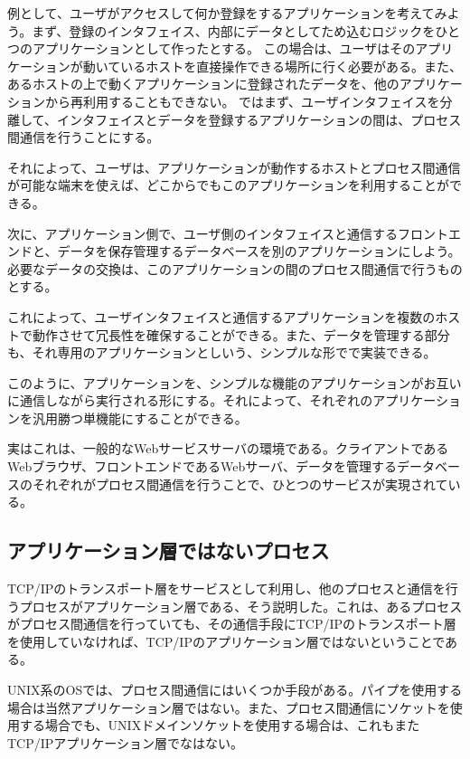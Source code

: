 例として、ユーザがアクセスして何か登録をするアプリケーションを考えてみよう。まず、登録のインタフェイス、内部にデータとしてため込むロジックをひとつのアプリケーションとして作ったとする。
この場合は、ユーザはそのアプリケーションが動いているホストを直接操作できる場所に行く必要がある。また、あるホストの上で動くアプリケーションに登録されたデータを、他のアプリケーションから再利用することもできない。
ではまず、ユーザインタフェイスを分離して、インタフェイスとデータを登録するアプリケーションの間は、プロセス間通信を行うことにする。

それによって、ユーザは、アプリケーションが動作するホストとプロセス間通信が可能な端末を使えば、どこからでもこのアプリケーションを利用することができる。

次に、アプリケーション側で、ユーザ側のインタフェイスと通信するフロントエンドと、データを保存管理するデータベースを別のアプリケーションにしよう。必要なデータの交換は、このアプリケーションの間のプロセス間通信で行うものとする。

これによって、ユーザインタフェイスと通信するアプリケーションを複数のホストで動作させて冗長性を確保することができる。また、データを管理する部分も、それ専用のアプリケーションとしいう、シンプルな形でで実装できる。

このように、アプリケーションを、シンプルな機能のアプリケーションがお互いに通信しながら実行される形にする。それによって、それぞれのアプリケーションを汎用勝つ単機能にすることができる。

実はこれは、一般的なWebサービスサーバの環境である。クライアントであるWebブラウザ、フロントエンドであるWebサーバ、データを管理するデータベースのそれぞれがプロセス間通信を行うことで、ひとつのサービスが実現されている。



\subsection{アプリケーション層ではないプロセス}
TCP/IPのトランスポート層をサービスとして利用し、他のプロセスと通信を行うプロセスがアプリケーション層である、そう説明した。これは、あるプロセスがプロセス間通信を行っていても、その通信手段にTCP/IPのトランスポート層を使用していなければ、TCP/IPのアプリケーション層ではないということである。

UNIX系のOSでは、プロセス間通信にはいくつか手段がある。パイプを使用する場合は当然アプリケーション層ではない。また、プロセス間通信にソケットを使用する場合でも、UNIXドメインソケットを使用する場合は、これもまたTCP/IPアプリケーション層でなはない。

